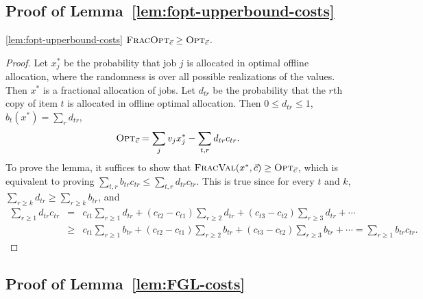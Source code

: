 
\subsection{Proof of Lemma~\ref{lem:fopt-upperbound-costs}}

\begin{numberedlemma}{\ref{lem:fopt-upperbound-costs}}
    ${\normalfont\textsc{FracOpt}}_{\vec{c}} \ge {\normalfont\textsc{Opt}}_{\vec{c}}$.
\end{numberedlemma}
\begin{proof}
    Let $x^*_j$ be the probability that job $j$ is allocated in optimal offline allocation, where
    the randomness is over all possible realizations of the values. Then $x^*$ is a fractional
    allocation of jobs.
    Let $d_{tr}$ be the probability that the $r$th copy of item $t$ is allocated in 
    offline optimal allocation. Then $0\leq d_{tr}\leq 1$, $b_t(x^*)=\sum_{r}d_{tr}$,
    \begin{equation*}
        {\normalfont\textsc{Opt}}_{\vec{c}}=\sum_{j}v_jx^*_j-\sum_{t,r}d_{tr}c_{tr}.
    \end{equation*}
    To prove the lemma, it suffices to show that ${\normalfont\textsc{FracVal}}(x^*,\vec{c})\geq{\normalfont\textsc{Opt}}_{\vec{c}}$, which is equivalent 
    to proving $\sum_{t,r}b_{tr}c_{tr}\leq\sum_{t,r}d_{tr}c_{tr}$. This is true since for every $t$ and $k$,
    $\sum_{r\geq k}d_{tr}\geq\sum_{r\geq k}b_{tr}$, and 
    \begin{eqnarray*}
        \sum_{r\geq 1}d_{tr}c_{tr}&=&c_{t1}\sum_{r\geq 1}d_{tr}+(c_{t2}-c_{t1})\sum_{r\geq 2}d_{tr}+(c_{t3}-c_{t2})\sum_{r\geq 3}d_{tr}+\cdots\\
        &\geq&c_{t1}\sum_{r\geq 1}b_{tr}+(c_{t2}-c_{t1})\sum_{r\geq 2}b_{tr}+(c_{t3}-c_{t2})\sum_{r\geq 3}b_{tr}+\cdots=\sum_{r\geq 1}b_{tr}c_{tr}.
    \end{eqnarray*} 
\end{proof}

\subsection{Proof of Lemma~\ref{lem:FGL-costs}}

